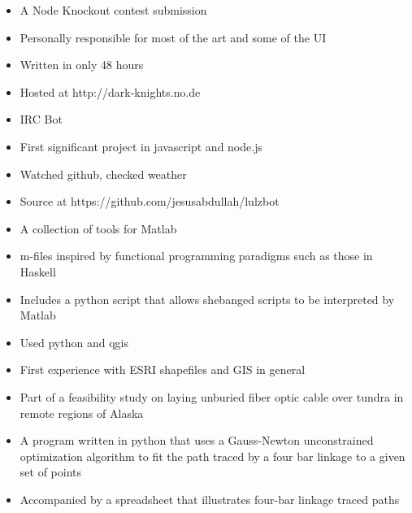 \documentclass{resume}
\begin{document}
    \small
    \begin{itemize}
        \item A Node Knockout contest submission
        \item Personally responsible for most of the art and some of the UI
        \item Written in only 48 hours
        \item Hosted at http://dark-knights.no.de
    \end{itemize}
    \normalsize
        
    \small
    \begin{itemize}
        \item IRC Bot
        \item First significant project in javascript and node.js
        \item Watched github, checked weather
        \item Source at https://github.com/jesusabdullah/lulzbot
    \end{itemize}\normalsize

    \small
    \begin{itemize}
        \item A collection of tools for Matlab
        \item m-files inspired by functional programming paradigms such as those in Haskell
        \item Includes a python script that allows shebanged scripts to be interpreted by Matlab
    \end{itemize}\normalsize
        
    
    \small
    \begin{itemize}
         \item Used python and qgis
         \item First experience with ESRI shapefiles and GIS in general
         \item Part of a feasibility study on laying unburied fiber optic cable over tundra in remote regions of Alaska
    \end{itemize}
    \normalsize

    \small
    \begin{itemize}
        \item A program written in python that uses a Gauss-Newton unconstrained optimization algorithm to fit the path traced by a four bar linkage to a given set of points
        \item Accompanied by a spreadsheet that illustrates four-bar linkage traced paths
    \end{itemize}
    \normalsize
\end{document}
